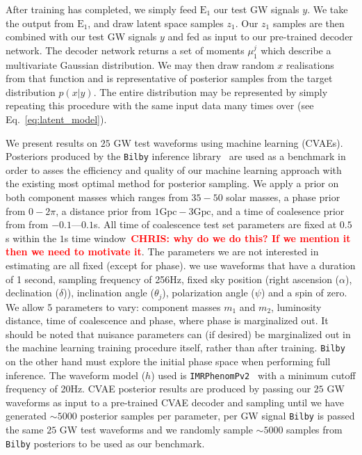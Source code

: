 \documentclass[%
showpacs,
 amsmath,amssymb,
 aps,
 twocolumn,
 prl,
 reprint,
floatfix,
]{revtex4-1}
\newcommand{\chris}[1]{\textbf{\textcolor{red}{CHRIS: #1}}}
\begin{document}
%
%
After training has completed, we simply feed $\textrm{E}_1$ our test GW signals
$y$. We take the output from $\textrm{E}_1$, and draw latent space samples 
$z_1$. Our
$z_1$ samples are then combined with our test GW signals $y$ and fed
as input to our pre-trained decoder network. The decoder network returns a set
of moments $\mu^{j}_1$ which describe a multivariate Gaussian distribution.
We may then draw random $x$ realisations from that function and is representative of posterior samples from the target
distribution $p(x|y)$. The entire distribution may be represented by 
simply repeating this procedure with the same input data many times over  
(see Eq.~\ref{eq:latent_model}).

%
%
We present results on $25$ \ac{GW} test waveforms using machine learning 
(\ac{CVAE}s). Posteriors produced by the \texttt{Bilby} inference library~\cite{1811.02042} are used as a benchmark 
in order to asses the efficiency and quality of our machine learning approach 
with the existing most optimal method for posterior sampling. We apply a prior on both component masses which ranges from $35 - 50$
solar masses, a phase prior from $0 - 2\pi$, a distance prior from  $1\textrm{Gpc} - 3\textrm{Gpc}$, and a time of coalesence prior from
from $-0.1$---$0.1$s. All time of coalescence test set
parameters are fixed at $0.5$s
within the $1$s time window~\chris{why do we do this? If we mention it then we
need to motivate it}. The parameters we are not interested in estimating are all fixed (except for phase). we use waveforms that have a duration of 1 second, sampling frequency
of 256Hz, fixed sky position (right ascension ($\alpha$), declination ($\delta$)), inclination angle ($\theta_j$), polarization angle ($\psi$) and a spin of zero. We allow 5 parameters to vary: component masses $m_1$ and $m_2$, luminosity
distance, time of coalescence and phase, where phase is marginalized
out. It should be noted that nuisance parameters can (if desired) be 
marginalized out in the machine learning training procedure itself, rather 
than after training. \texttt{Bilby} on the other hand must explore the initial 
phase space when performing full inference. The waveform
model ($h$) used is
\texttt{IMRPhenomPv2}~\cite{1809.10113} with a minimum cutoff frequency of
20Hz. \ac{CVAE} posterior results are produced by passing our $25$ \ac{GW} 
waveforms as input to a pre-trained \ac{CVAE} decoder and sampling until we have 
generated $\sim5000$ posterior samples per parameter, per \ac{GW} signal 
\texttt{Bilby} is passed the same $25$ \ac{GW} test waveforms and we randomly sample $\sim5000$ samples from \texttt{Bilby} posteriors to be used as our benchmark.
\end{document}
